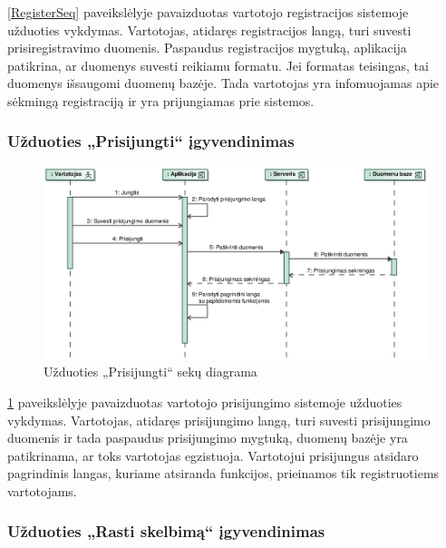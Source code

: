 \documentclass[12pt]{article}
\begin{document}
	\ref{RegisterSeq} paveikslėlyje pavaizduotas vartotojo registracijos sistemoje užduoties vykdymas. Vartotojas, atidaręs registracijos langą, turi suvesti prisiregistravimo duomenis. Paspaudus registracijos mygtuką, aplikacija patikrina, ar duomenys suvesti reikiamu formatu. Jei formatas teisingas, tai duomenys išsaugomi duomenų bazėje. Tada vartotojas yra infomuojamas apie sėkmingą registraciją ir yra prijungiamas prie sistemos.
	\pagebreak
	
	\subsubsection{Užduoties „Prisijungti“ įgyvendinimas}
	
	\begin{figure}[h]
		\begin{center}
			\includegraphics[width=\textwidth]{Prisijungti.eps}
			\caption{Užduoties „Prisijungti“ sekų diagrama\label{LogInSeq}}
		\end{center}
	\end{figure}
	
	\ref{LogInSeq} paveikslėlyje pavaizduotas vartotojo prisijungimo sistemoje užduoties vykdymas. Vartotojas, atidaręs prisijungimo langą, turi suvesti prisijungimo duomenis ir tada paspaudus prisijungimo mygtuką, duomenų bazėje yra patikrinama, ar toks vartotojas egzistuoja. Vartotojui prisijungus atsidaro pagrindinis langas, kuriame atsiranda funkcijos, prieinamos tik registruotiems vartotojams.
	\pagebreak
	
	\subsubsection{Užduoties „Rasti skelbimą“ įgyvendinimas}
	
\end{document}
